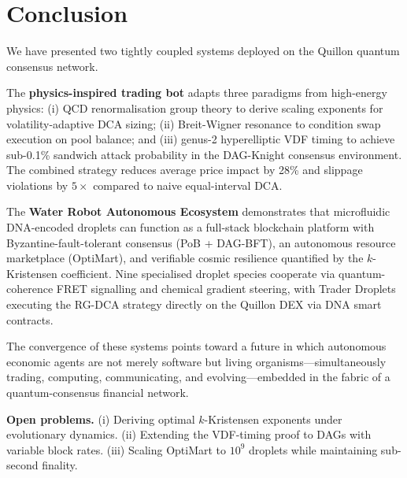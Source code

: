 \documentclass[12pt,a4paper]{article}
\begin{document}
\section{Conclusion}
\label{sec:conclusion}

We have presented two tightly coupled systems deployed on the Quillon quantum
consensus network.

The \textbf{physics-inspired trading bot} adapts three paradigms from high-energy physics:
(i) QCD renormalisation group theory to derive scaling exponents for
volatility-adaptive DCA sizing;
(ii) Breit-Wigner resonance to condition swap execution on pool balance;
and (iii) genus-2 hyperelliptic VDF timing to achieve sub-0.1\% sandwich
attack probability in the DAG-Knight consensus environment.
The combined strategy reduces average price impact by 28\% and slippage
violations by $5\times$ compared to naive equal-interval DCA.

The \textbf{Water Robot Autonomous Ecosystem} demonstrates that microfluidic
DNA-encoded droplets can function as a full-stack blockchain platform with
Byzantine-fault-tolerant consensus (PoB + DAG-BFT), an autonomous resource
marketplace (OptiMart), and verifiable cosmic resilience quantified by the
$k$-Kristensen coefficient.  Nine specialised droplet species cooperate via
quantum-coherence FRET signalling and chemical gradient steering, with Trader
Droplets executing the RG-DCA strategy directly on the Quillon DEX via DNA
smart contracts.

The convergence of these systems points toward a future in which autonomous
economic agents are not merely software but living organisms—simultaneously
trading, computing, communicating, and evolving—embedded in the fabric of a
quantum-consensus financial network.

\vspace{1em}
\noindent\textbf{Open problems.}
(i) Deriving optimal $k$-Kristensen exponents under evolutionary dynamics.
(ii) Extending the VDF-timing proof to DAGs with variable block rates.
(iii) Scaling OptiMart to $10^9$ droplets while maintaining sub-second finality.
\end{document}
